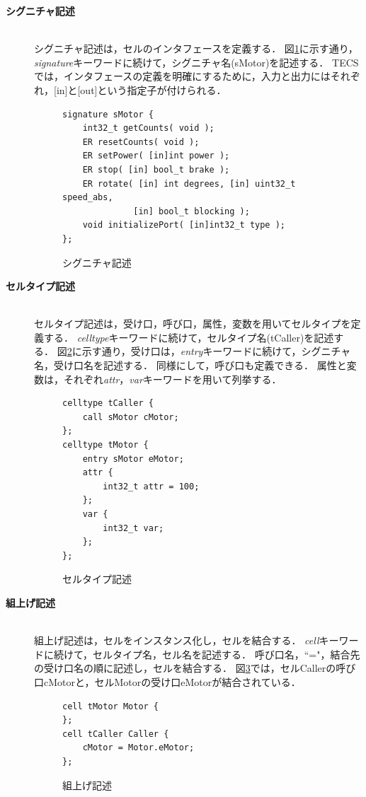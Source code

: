 \documentclass[submit]{ipsj_v2/UTF8/ipsj}
\begin{document}
\begin{description}
    \item[{\bf シグニチャ記述}]\mbox{}\\
        シグニチャ記述は，セルのインタフェースを定義する．
        図\ref{signature}に示す通り，{\it signature}キーワードに続けて，シグニチャ名(sMotor)を記述する．
        TECSでは，インタフェースの定義を明確にするために，入力と出力にはそれぞれ，[in]と[out]という指定子が付けられる．
        
\begin{figure}[t]
\centering
\begin{lstlisting}
signature sMotor {
    int32_t getCounts( void );
    ER resetCounts( void );
    ER setPower( [in]int power );
    ER stop( [in] bool_t brake );
    ER rotate( [in] int degrees, [in] uint32_t speed_abs,
              [in] bool_t blocking );
    void initializePort( [in]int32_t type );
};
\end{lstlisting}
\caption{シグニチャ記述}
\label{signature}
\end{figure}

    \item[{\bf セルタイプ記述}]\mbox{}\\
        セルタイプ記述は，受け口，呼び口，属性，変数を用いてセルタイプを定義する．
        {\it celltype}キーワードに続けて，セルタイプ名(tCaller)を記述する．
        図\ref{celltype}に示す通り，受け口は，{\it entry}キーワードに続けて，シグニチャ名，受け口名を記述する．
        同様にして，呼び口も定義できる．
        属性と変数は，それぞれ{\it attr}，{\it var}キーワードを用いて列挙する．

\begin{figure}[t]
\centering
\begin{lstlisting}
celltype tCaller {
    call sMotor cMotor;
};
celltype tMotor {
    entry sMotor eMotor;
    attr {
        int32_t attr = 100;
    };
    var {
        int32_t var;
    };
};
\end{lstlisting}
\caption{セルタイプ記述}  
\label{celltype}
\end{figure}

    \item[{\bf 組上げ記述}]\mbox{}\\
        組上げ記述は，セルをインスタンス化し，セルを結合する．
        {\it cell}キーワードに続けて，セルタイプ名，セル名を記述する．
        呼び口名，``="，結合先の受け口名の順に記述し，セルを結合する．
        図\ref{build}では，セルCallerの呼び口cMotorと，セルMotorの受け口eMotorが結合されている．
        
\begin{figure}[t]
\centering
\begin{lstlisting}
cell tMotor Motor {
};
cell tCaller Caller {
    cMotor = Motor.eMotor;
};
\end{lstlisting}
\caption{組上げ記述}
\label{build}
\end{figure}

\end{description}
\end{document}
